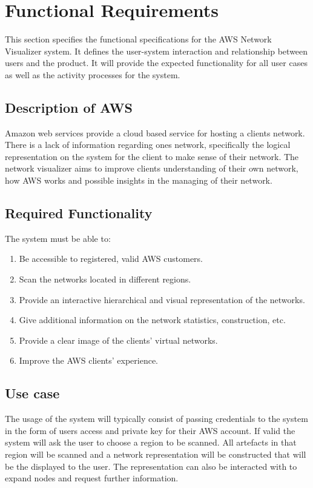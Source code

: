 \documentclass[hidelinks,a4paper,12pt]{article}
\begin{document}
\newpage
\section{Functional Requirements}
	This section specifies the functional specifications for the AWS Network Visualizer system. It defines the user-system interaction and relationship between users and the product. It will provide the expected functionality for all user cases as well as the activity processes for the system.
	
		\subsection{Description of AWS}
			Amazon web services provide a cloud based service for hosting a clients network. There is a lack of information regarding ones network, specifically the logical representation on the system for the client to make sense of their network. The network visualizer aims to improve clients understanding of their own network, how AWS works and possible insights in the managing of their network.
		\subsection{Required Functionality}
			The system must be able to:
				\begin{enumerate}  
					\item Be accessible to registered, valid AWS customers.
					\item Scan the networks located in different regions. 
					\item Provide an interactive hierarchical and visual representation of the networks.
					\item Give additional information on the network statistics, construction, etc.
					\item Provide a clear image of the clients' virtual networks.
					\item Improve the AWS clients' experience.
				\end{enumerate}
				
		\subsection{Use case}
		The usage of the system will typically consist of passing credentials to the system in the form of users access and private key for their AWS account. If valid the system will ask the user to choose a region to be scanned. All artefacts in that region will be scanned and a network representation will
		be constructed that will be the displayed to the user. The representation can also be interacted with	to expand nodes and request further information.
		
\end{document}
